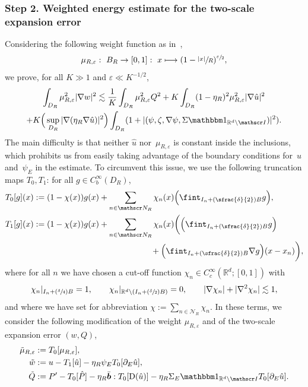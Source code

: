 \documentclass[10pt]{amsart}
\let\mathcal\mathscr
\newcommand\mto{\mathchoice{\longmapsto}{\mapsto}{\mapsto}{\mapsto}}
\newcommand{\Psfrac}[2]{(\sfrac{#1}{#2})}
\let\mathds\mathbbm
\theoremstyle{plain}
\theoremstyle{definition}
\newcommand{\e}{\varepsilon}
\newcommand{\R}{\mathbb R}
\newcommand{\Ic}{\mathcal I}
\newcommand{\Nc}{\mathcal N}
\newcommand{\D}{\operatorname{D}}
\newcommand{\bb}{\bar{\boldsymbol b}}
\newcommand{\step}[1]{\subsubsection*{Step #1}}
\begin{document}
\step{2. Weighted energy estimate for the two-scale expansion error}
Considering the following weight function as in~\cite{GNO-reg},
\begin{equation}\label{eq:def-muReps}
\mu_{R,\e}:~B_R \to [0,1]:~ x\mto(1-\sfrac{|x|}{R})^{\sfrac\e2},
\end{equation}
we prove, for all $K\gg1$ and $\e\ll K^{-1/2}$,
\begin{multline}\label{e.p1.8}
\int_{D_R} \mu_{R,\e}^2|\nabla w|^2
\lesssim \frac1K\int_{D_R}\mu_{R,\e}^2Q^2+K\int_{D_R}(1-\eta_R)^2\mu_{R,\e}^2|\nabla\hat u|^2\\
+K\Big(\sup_{D_R}|\nabla(\eta_R\nabla\hat u)|^2\Big)\int_{D_R}(1+|(\psi,\zeta,\nabla\psi,\Sigma\mathds1_{\R^d\setminus\Ic})|^2).
\end{multline}
The main difficulty is that neither $\hat u$ nor~$\mu_{R,\e}$ is constant inside the inclusions, which prohibits us from easily taking advantage of the boundary conditions for~$u$ and~$\psi_E$ in the estimate.
To circumvent this issue, we use the following truncation maps $T_0,T_1$: for all $g\in C^\infty_b(D_R)$,
\begin{equation}\label{eq:def-T0T1}
\begin{aligned}
T_0[g](x)&:= (1-\chi(x))g(x)+\sum_{n\in\Nc_R}\chi_n(x)\Big(\fint_{I_n+\Psfrac\delta2 B}g\Big),\\
T_1[g](x)&:= (1-\chi(x))g(x)+\sum_{n\in\Nc_R}\chi_n(x)\bigg(\Big(\fint_{I_n+\Psfrac\delta2 B}g\Big)\\
&\hspace*{5cm}+\Big(\fint_{I_n+\Psfrac\delta2 B}\nabla g\Big)(x-x_n)\bigg),
\end{aligned}
\end{equation}
where for all $n$ we have chosen a cut-off function $\chi_n\in C^\infty_c(\R^d;[0,1])$ with
\[\chi_n|_{I_n+\Psfrac\delta4B}= 1, \qquad\chi_n|_{\R^d\setminus(I_n+\Psfrac\delta2 B)}=0,\qquad|\nabla \chi_n|+|\nabla^2\chi_n|\lesssim 1,\]
and where we have set for abbreviation $\chi:=\sum_{n\in\Nc_R}\chi_n$.
In these terms,
we consider the following modification of the weight $\mu_{R,\e}$ and of the two-scale expansion error $(w,Q)$,
\begin{equation}\label{eq:trunc-wQ}
\begin{aligned}
\tilde \mu_{R,\e}&:= T_0[\mu_{R,\e}],\\
\tilde w&:= u-T_1[\hat u]-\eta_R\psi_ET_0[\partial_E\hat u],\\
\tilde Q&:= P'-T_0[\hat P]-\eta_R\bb:T_0[\D(\hat u)]-\eta_R\Sigma_E\mathds1_{\R^d\setminus\Ic}T_0[\partial_E\hat u].
\end{aligned}
\end{equation}
\end{document}
